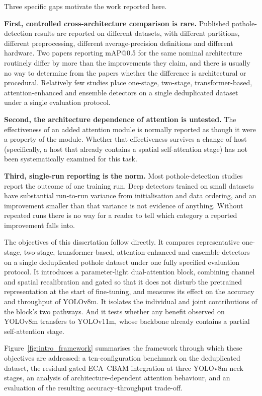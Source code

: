 \documentclass[MScCS]{uccthesis}
\begin{document}
Three specific gaps motivate the work reported here.

\textbf{First, controlled cross-architecture comparison is rare.} Published
pothole-detection results are reported on different datasets, with different
partitions, different preprocessing, different average-precision definitions
and different hardware. Two papers reporting mAP@0.5 for the same nominal
architecture routinely differ by more than the improvements they claim, and
there is usually no way to determine from the papers whether the difference is
architectural or procedural. Relatively few studies place one-stage, two-stage,
transformer-based, attention-enhanced and ensemble detectors on a single
deduplicated dataset under a single evaluation protocol.

\textbf{Second, the architecture dependence of attention is untested.} The
effectiveness of an added attention module is normally reported as though it
were a property of the module. Whether that effectiveness survives a change of
host (specifically, a host that already contains a spatial self-attention
stage) has not been systematically examined for this task.

\textbf{Third, single-run reporting is the norm.} Most pothole-detection
studies report the outcome of one training run. Deep detectors trained on small
datasets have substantial run-to-run variance from initialisation and data
ordering, and an improvement smaller than that variance is not evidence of
anything. Without repeated runs there is no way for a reader to tell which
category a reported improvement falls into.

The objectives of this dissertation follow directly. It compares
representative one-stage, two-stage, transformer-based, attention-enhanced and
ensemble detectors on a single deduplicated pothole dataset under one fully
specified evaluation protocol. It introduces a parameter-light dual-attention
block, combining channel and spatial recalibration and gated so that it does
not disturb the pretrained representation at the start of fine-tuning, and
measures its effect on the accuracy and throughput of YOLOv8m. It isolates the
individual and joint contributions of the block's two pathways. And it tests
whether any benefit observed on YOLOv8m transfers to YOLOv11m, whose backbone
already contains a partial self-attention stage.

Figure~\ref{fig:intro_framework} summarises the framework through which these
objectives are addressed: a ten-configuration benchmark on the deduplicated
dataset, the residual-gated ECA--CBAM integration at three YOLOv8m neck stages,
an analysis of architecture-dependent attention behaviour, and an evaluation of
the resulting accuracy--throughput trade-off.
\end{document}
